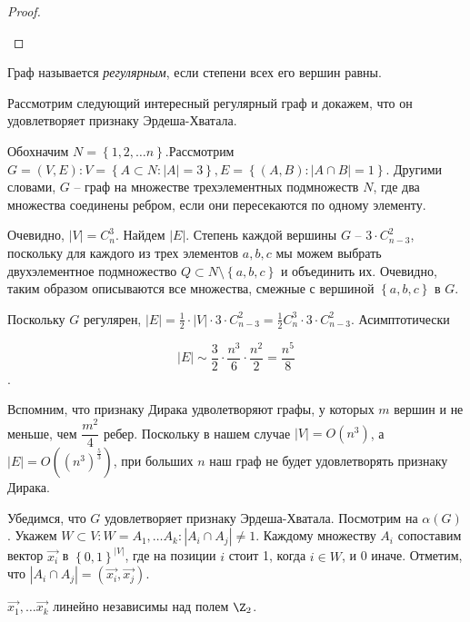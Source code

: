 \begin{proof}
\begin{enumerate}
	\end{enumerate}
\end{proof}

\begin{Def}
	Граф называется \emph{регулярным}, если степени всех его вершин равны.
\end{Def}

Рассмотрим следующий интересный регулярный граф и докажем, что он удовлетворяет признаку Эрдеша-Хватала.

Обохначим $ N = \left\lbrace 1, 2, \ldots n\right\rbrace $.Рассмотрим $ G = (V, E) : V = \left\lbrace A \subset N  : |A| = 3 \right\rbrace, E = \left\lbrace (A, B) : |A\cap B| = 1\right\rbrace  $. Другими словами, $ G $ -- граф на множестве трехэлементных подмножеств $ N $, где два множества соединены ребром, если они пересекаются по одному элементу.

Очевидно, $ |V| = C_n^3 $. Найдем $|E|$. Степень каждой вершины $  G $ -- $3 \cdot C_{n - 3}^2$, поскольку для каждого из трех элементов $ {a, b, c} $ мы можем выбрать двухэлементное подмножество $ Q \subset N \setminus \left\lbrace a, b, c \right\rbrace $ и объединить их. Очевидно, таким образом описываются все множества, смежные с вершиной  $ \left\lbrace a, b, c\right\rbrace $ в $ G $.

Поскольку $  G $ регулярен,  $ |E| = \frac{1}{2} \cdot |V| \cdot 3 \cdot  C_{n - 3}^2  = \frac{1}{2} C_n^3 \cdot 3 \cdot  C_{n - 3}^2 $. Асимптотически

$$ |E| \sim \dfrac{3}{2} \cdot \dfrac{n^3}{6} \cdot \dfrac{n^2}{2} =\dfrac{n^5}{8} $$.

Вспомним, что признаку Дирака удволетворяют графы, у которых $ m $ вершин и не меньше, чем $ \dfrac{m^2}{4} $ ребер.
Поскольку в нашем случае $|V| = O(n^3)$, а $|E| = O((n^3)^{\frac{5}{3}}) $, при больших $ n $ наш граф не будет удовлетворять признаку Дирака.

Убедимся, что $ G $ удовлетворяет признаку Эрдеша-Хватала. 
Посмотрим на $ \alpha(G) $. Укажем $ W \subset V : W = {A_1, \ldots A_k} : |A_i \cap A_j| \neq 1 $.
Каждому множеству $ A_i $ сопоставим вектор $ \overrightarrow{x_i} $ в $ \left\lbrace 0, 1\right\rbrace ^{|V|} $, где на позиции $ i $ стоит 1, когда $ i \in W $, и 0 иначе.
Отметим, что $ |A_i \cap A_j| = (\overrightarrow{x_i}, \overrightarrow{x_j}) $.

\begin{lemma}
	$ \overrightarrow{x_1}, \ldots \overrightarrow{x_k} $ линейно независимы над полем $ \Z_2 $.
\end{lemma}  

